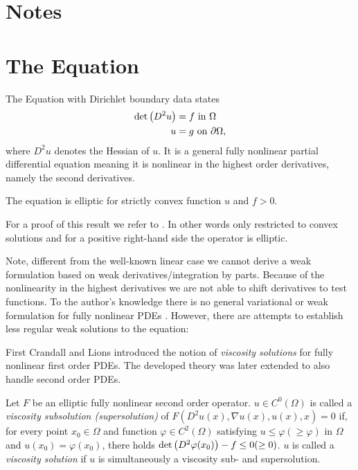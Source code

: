 \section{Notes}

\section{The \MA Equation}

The \MA Equation with Dirichlet boundary data states
\begin{align}
	 \det{\left(D^2 u\right)} &= f \textnormal{ in } \Omega \label{MA eq}\\
	 u & = g \textnormal{ on } \partial \Omega,
\end{align}
where $D^2 u$ denotes the Hessian of $u$.
It is a general fully nonlinear partial differential equation meaning it is nonlinear in the highest order derivatives, namely the second derivatives.

\begin{proposition}
	The \MA equation is elliptic for strictly convex function $u$ and $f > 0$.
\end{proposition}
For a proof of this result we refer to \cite{CC1995, GT1977}. In other words only restricted to convex solutions and for a positive right-hand side the \MA operator is elliptic.

Note, different from the well-known linear case we cannot derive a weak formulation based on weak derivatives/integration by parts. Because of the nonlinearity in the highest derivatives we are not able to shift derivatives to test functions. To the author's knowledge there is no general variational or weak formulation for fully nonlinear PDEs \cite{FGN2013}.
However, there are attempts to establish less regular weak solutions to the \MA equation:

First Crandall and Lions \cite{CL1983} introduced the notion of \emph{viscosity solutions} for fully nonlinear first order PDEs. The developed theory was later extended to also handle second order PDEs.
\begin{definition}
	Let $F$ be an elliptic  fully nonlinear second order operator.
	$u \in C^0(\Omega)$ is called a \emph{viscosity subsolution (supersolution)} of $F(D^2u(x), \nabla u(x), u(x), x)=0$  if, for every point $x_0 \in \Omega$ and function $\varphi \in C^2(\Omega)$ satisfying $u \leq \varphi (\geq \varphi)$ in $\Omega$ and $u(x_0) = \varphi(x_0)$, there holds $\det{\left(D^2 \varphi(x_0)\right)} - f \leq 0 (\geq 0)$. 
	$u$ is called a \emph{viscosity solution} if $u$ is simultaneously a viscosity sub- and supersolution.
\end{definition}

